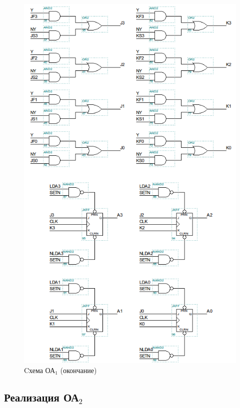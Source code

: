 \begin{figure}[H]
	\includegraphics[scale=0.6]{images/altera/oa1_2.png}
	\caption{Cхема ОА$_{1}$ (окончание)}
	\label{figure:oa1-2log}
\end{figure}


\clearpage
\subsection{Реализация ОА${}_2$}

